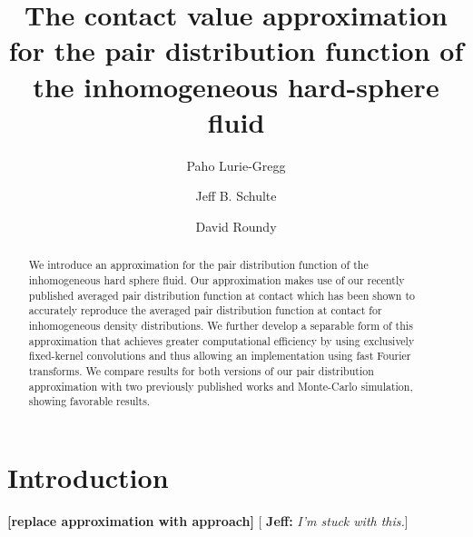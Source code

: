 \documentclass[letterpaper,twocolumn,amsmath,amssymb,pre,aps,10pt]{revtex4-1}
\newcommand{\red}[1]{{\bf \color{red} #1}}
\newcommand{\cyan}[1]{{\bf \color{cyan} #1}}
\newcommand{\fixme}[1]{\red{[#1]}}
\newcommand{\jeffsays}[1]{{\color{red} [\cyan{Jeff:} \emph{#1}]}}
\begin{document}
\title{The contact value approximation for the pair distribution function of the inhomogeneous hard-sphere
  fluid}

\author{Paho Lurie-Gregg}
\author{Jeff B. Schulte}
\author{David Roundy}

\begin{abstract}
We introduce an approximation for the pair distribution function of
the inhomogeneous hard sphere fluid. Our approximation makes use of
our recently published averaged pair distribution function at contact
which has been shown to accurately reproduce the averaged pair
distribution function at contact for inhomogeneous density
distributions. We further develop a separable form of this
approximation that achieves greater computational efficiency by using
exclusively fixed-kernel convolutions and thus allowing an
implementation using fast Fourier transforms. We compare results for
both versions of our pair distribution approximation with two
previously published works and Monte-Carlo simulation, showing
favorable results.
\end{abstract}

\maketitle

\section{Introduction}

\fixme{replace approximation with approach}\jeffsays{I'm stuck with this.}
\end{document}
